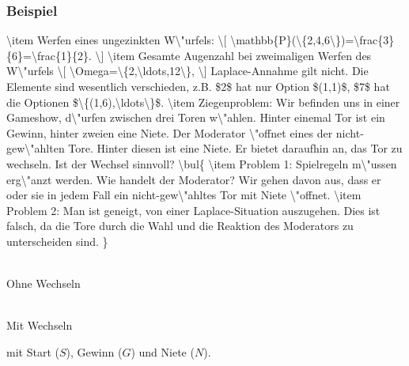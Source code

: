 \subsubsection{Beispiel}
\num{
\item Werfen eines ungezinkten W\"urfels:
\[
\mathbb{P}(\{2,4,6\})=\frac{3}{6}=\frac{1}{2}.
\]
\item Gesamte Augenzahl bei zweimaligen Werfen des W\"urfels
\[
\Omega=\{2,\ldots,12\},
\]
Laplace-Annahme gilt nicht. Die Elemente sind wesentlich verschieden, z.B. $2$ hat nur Option $(1,1)$, $7$ hat die Optionen $\{(1,6),\ldots\}$.
\item Ziegenproblem: Wir befinden uns in einer Gameshow, d\"urfen zwischen drei Toren w\"ahlen. Hinter einemal Tor ist ein Gewinn, hinter zweien eine Niete. Der Moderator \"offnet eines der nicht-gew\"ahlten Tore. Hinter diesen ist eine Niete. Er bietet daraufhin an, das Tor zu wechseln. Ist der Wechsel sinnvoll?
\bul{
\item Problem 1: Spielregeln m\"ussen erg\"anzt werden. Wie handelt der Moderator? Wir gehen davon aus, dass er oder sie in jedem Fall ein nicht-gew\"ahltes Tor mit Niete \"offnet.
\item Problem 2: Man ist geneigt, von einer Laplace-Situation auszugehen. Dies ist falsch, da die Tore durch die Wahl und die Reaktion des Moderators zu unterscheiden sind.
}
}
\begin{center}
\begin{minipage}{0.45\textwidth}
\centering
{}\\
Ohne Wechseln
\end{minipage}
\begin{minipage}{0.45\textwidth}
\centering
{}\\
Mit Wechseln
\end{minipage}
\end{center}
mit Start ($S$), Gewinn ($G$) und Niete ($N$).
